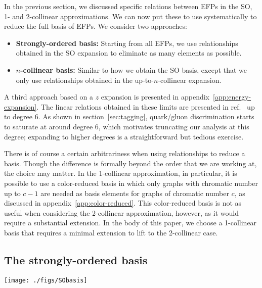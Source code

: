 \documentclass[a4paper,11pt]{article}
\renewcommand{\sec}[1]{section~\ref{sec:#1}}
\newcommand{\app}[1]{appendix~\ref{app:#1}}
\newcommand{\refcite}[1]{ref.~\cite{#1}}
\begin{document}
In the previous section, we discussed specific relations between EFPs in the SO, 1- and 2-collinear approximations.
%
We can now put these to use systematically to reduce the full basis of EFPs.
%
We consider two approaches:
%
\begin{itemize}
\item 
 \textbf{Strongly-ordered basis:} Starting from all EFPs, we use relationships obtained in the SO expansion to eliminate as many elements as possible. 
\item
 \textbf{$n$-collinear basis:} Similar to how we obtain the SO basis, except that we only use relationships obtained in the up-to-$n$-collinear expansion.
\end{itemize}
%
A third approach based on a $z$ expansion is presented in \app{energy-expansion}.
%
The linear relations obtained in these limits are presented in \refcite{cal_pedro_2022_6542205} up to degree 6. As shown in \sec{tagging}, quark/gluon discrimination starts to saturate at around degree 6, which motivates truncating our analysis at this degree; expanding to higher degrees is a straightforward but tedious exercise.


There is of course a certain arbitrariness when using relationships to reduce a basis.
%
Though the difference is formally beyond the order that we are working at, the choice may matter.
%
In the 1-collinear approximation, in particular, it is possible to use a color-reduced basis in which only graphs with chromatic number up to $c-1$ are needed as basis elements for graphs of chromatic number $c$, as discussed in \app{color-reduced}.
%
This color-reduced basis is not as useful when considering the 2-collinear approximation, however, as it would require a substantial extension.
%
In the body of this paper, we choose a 1-collinear basis that requires a minimal extension to lift to the 2-collinear case.

\subsection{The strongly-ordered basis}
\label{sec:SO_basis_present}

\begin{table}[t]
  \texttt{[image: ./figs/SObasis]}
  \caption{Basis of prime EFPs up to degree 6 in the strongly-ordered (SO) expansion.
  \label{tab:LLbasis}}
\end{table}
\end{document}
